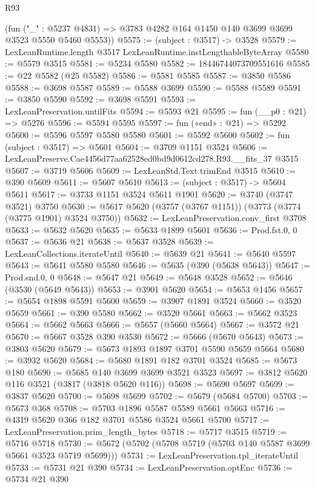 \begin{lexlean}{R93}
\begin{coremodule}
      (fun ("_" : @5237 @4831) => @3783 @4282 @164 @1450 @140 @3699 @3699 @3523 @5550 @5460 @5553))
@5575 := (subject : @3517) -> @3528
@5579 := LexLeanRuntime.length @3517 LexLeanRuntime.instLengthableByteArray
@5580 := @5579 @3515
@5581 := @5234 @5580
@5582 := 18446744073709551616
@5585 := @22 @5582 (@25 @5582)
@5586 := @5581 @5585
@5587 := @3850 @5586
@5588 := @3698 @5587
@5589 := @5588 @3699
@5590 := @5588 @5589
@5591 := @3850 @5590
@5592 := @3698 @5591
@5593 := LexLeanPreservation.untilFits
@5594 := @5593 @21
@5595 := fun (__p0 : @21) => @5276
@5596 := @5594 @5595
@5597 := fun («end» : @21) => @5292
@5600 := @5596 @5597 @5580 @5580
@5601 := @5592 @5600
@5602 := fun (subject : @3517) => @5601
@5604 := @3709 @1151 @3524
@5606 := LexLeanPreserve.Cae4456d77aa62528ed0bd9d0612cd278.R93.__fits_37 @3515
@5607 := @3719 @5606
@5609 := LexLeanStd.Text.trimEnd @3515
@5610 := @390 @5609
@5611 := @5607 @5610
@5613 := (subject : @3517) -> @5604 @5611
@5617 := @3733 @1151 @3524 @5611 @1901
@5620 := @3740 (@3747 @3521) @3750
@5630 := @5617 @5620 (@3757 (@3767 @1151)) (@3773 (@3774 (@3775 @1901) @3524 @3750))
@5632 := LexLeanPreservation.conv_first @3708
@5633 := @5632 @5620
@5635 := @5633 @1899 @5601
@5636 := Prod.fst.{0, 0}
@5637 := @5636 @21
@5638 := @5637 @3528
@5639 := LexLeanCollections.iterateUntil
@5640 := @5639 @21
@5641 := @5640 @5597
@5643 := @5641 @5580 @5580
@5646 := @5635 (@390 (@5638 @5643))
@5647 := Prod.snd.{0, 0}
@5648 := @5647 @21
@5649 := @5648 @3528
@5652 := @5646 (@3530 (@5649 @5643))
@5653 := @3901 @5620
@5654 := @5653 @1456
@5657 := @5654 @1898 @5591 @5600
@5659 := @3907 @1891 @3524
@5660 := @3520 @5659
@5661 := @390 @5580
@5662 := @3520 @5661
@5663 := @5662 @3523
@5664 := @5662 @5663
@5666 := @5657 (@5660 @5664)
@5667 := @3572 @21
@5670 := @5667 @3528 @390 @3530
@5672 := @5666 (@5670 @5643)
@5673 := @3803 @5620
@5679 := @5673 @1893 @1897 @3701 @5590 @5659 @5664
@5680 := @3932 @5620
@5684 := @5680 @1891 @182 @3701 @3524
@5685 := @5673 @180
@5690 := @5685 @140 @3699 @3699 @3521 @3523
@5697 := @3812 @5620 @116 @3521 (@3817 (@3818 @5620 @116))
@5698 := @5690 @5697
@5699 := @3837 @5620
@5700 := @5698 @5699
@5702 := @5679 (@5684 @5700)
@5703 := @5673 @368
@5708 := @5703 @1896 @5587 @5589 @5661 @5663
@5716 := @4319 @5620 @366 @182 @3701 @5586 @3524 @5661 @5700
@5717 := LexLeanPreservation.prim_length_bytes
@5718 := @5717 @3515
@5719 := @5716 @5718
@5730 := @5672 (@5702 (@5708 @5719 (@5703 @140 @5587 @3699 @5661 @3523 @5719 @5699)))
@5731 := LexLeanPreservation.tpl_iterateUntil
@5733 := @5731 @21 @390
@5734 := LexLeanPreservation.optEnc
@5736 := @5734 @21 @390

\end{coremodule}
\end{lexlean}

